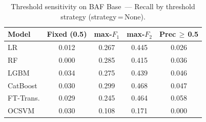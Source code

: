 \begin{table}[ht!]
\centering
\caption{Threshold sensitivity on BAF Base~--- Recall by threshold strategy (strategy\,=\,None).}
\label{tab:threshold_baf_recall}
\begin{tabular}{l c c c c}
\toprule
Model & Fixed (0.5) & max-$F_1$ & max-$F_2$ & Prec\,$\geq$\,0.5 \\
\midrule
LR         & 0.012 & 0.267 & 0.445 & 0.026 \\
RF         & 0.000 & 0.285 & 0.415 & 0.036 \\
LGBM       & 0.034 & 0.275 & 0.439 & 0.046 \\
CatBoost   & 0.030 & 0.299 & 0.468 & 0.047 \\
FT-Trans.  & 0.029 & 0.245 & 0.464 & 0.058 \\
OCSVM      & 0.030 & 0.108 & 0.171 & 0.000 \\
\bottomrule
\end{tabular}
\end{table}